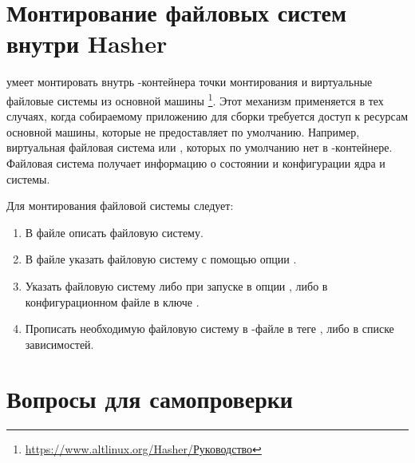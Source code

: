 \hypertarget{mount_fs_hasher}{\section{Монтирование файловых систем внутри Hasher}}
 умеет монтировать внутрь -контейнера точки монтирования и виртуальные файловые системы 
из основной машины%
\footnote{\href{https://www.altlinux.org/Hasher/\%D0\%A0\%D1\%83\%D0\%BA\%D0\%BE\%D0\%B2\%D0\%BE\%D0\%B4\%D1\%81\%D1\%82\%D0\%B2\%D0\%BE\#\%D0\%9C\%D0\%BE\%D0\%BD\%D1\%82\%D0\%B8\%D1\%80\%D0\%BE\%D0\%B2\%D0\%B0\%D0\%BD\%D0\%B8\%D0\%B5_\%D1\%84\%D0\%B0\%D0\%B9\%D0\%BB\%D0\%BE\%D0\%B2\%D1\%8B\%D1\%85_\%D1\%81\%D0\%B8\%D1\%81\%D1\%82\%D0\%B5\%D0\%BC_\%D0\%B2\%D0\%BD\%D1\%83\%D1\%82\%D1\%80\%D0\%B8_hasher}{https://www.altlinux.org/Hasher/Руководство}}. 
Этот механизм применяется в тех случаях, когда собираемому приложению для сборки требуется доступ к ресурсам 
основной машины, которые  не предоставляет по умолчанию. Например, виртуальная файловая система 
 или , которых по умолчанию нет в -контейнере. Файловая система  
получает информацию о состоянии и конфигурации ядра и системы.

Для монтирования файловой системы следует:
\begin{enumerate}
	\item В файле  описать файловую систему.
	\item В файле  указать файловую систему с помощью опции .
	\item Указать файловую систему либо при запуске  в опции , либо в 
		конфигурационном файле  в ключе .
	\item Прописать необходимую файловую систему в -файле в теге , либо в списке зависимостей.
\end{enumerate}

\section{Вопросы для самопроверки}

